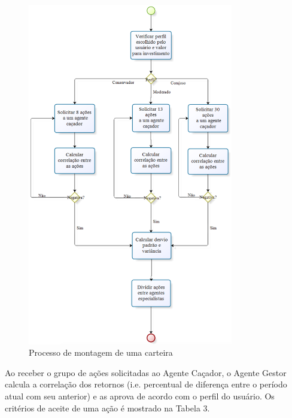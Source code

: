 \begin{figure}[h]
\centering
\label{f14}
\includegraphics[width=0.8\textwidth]{figuras/f14}
\caption{Processo de montagem de uma carteira}

\end{figure}


Ao receber o grupo de ações solicitadas ao Agente Caçador, o Agente Gestor calcula a correlação dos retornos (i.e. percentual de diferença entre o período atual com seu anterior) e as aprova de acordo com o perfil do usuário. Os critérios de aceite de uma ação é mostrado na Tabela 3.



